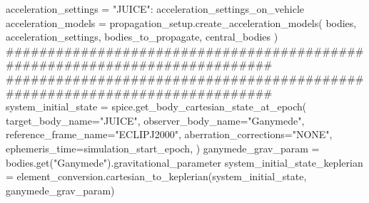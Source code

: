 {}
\markdownRendererSectionEnd \markdownRendererSectionBegin
{}\markdownRendererInterblockSeparator
{}acceleration_settings = {"JUICE": acceleration_settings_on_vehicle}\markdownRendererInterblockSeparator
{}
\markdownRendererSectionEnd \markdownRendererSectionBegin
{}\markdownRendererInterblockSeparator
{}acceleration_models = propagation_setup.create_acceleration_models( bodies, acceleration_settings, bodies_to_propagate, central_bodies )\markdownRendererInterblockSeparator
{}###########################################################################\markdownRendererInterblockSeparator
{}
\markdownRendererSectionEnd \markdownRendererSectionBegin
{}\markdownRendererInterblockSeparator
{}###########################################################################\markdownRendererInterblockSeparator
{}
\markdownRendererSectionEnd \markdownRendererSectionBegin
{}\markdownRendererInterblockSeparator
{}system_initial_state = spice.get_body_cartesian_state_at_epoch( target_body_name="JUICE", observer_body_name="Ganymede", reference_frame_name="ECLIPJ2000", aberration_corrections="NONE", ephemeris_time=simulation_start_epoch, )\markdownRendererInterblockSeparator
{}
\markdownRendererSectionEnd \markdownRendererSectionBegin
{}\markdownRendererInterblockSeparator
{}ganymede_grav_param = bodies.get("Ganymede").gravitational_parameter\markdownRendererInterblockSeparator
{}
\markdownRendererSectionEnd \markdownRendererSectionBegin
{}\markdownRendererInterblockSeparator
{}
\markdownRendererSectionEnd \markdownRendererSectionBegin
{}\markdownRendererInterblockSeparator
{}system_initial_state_keplerian = element_conversion.cartesian_to_keplerian(system_initial_state, ganymede_grav_param)\markdownRendererInterblockSeparator
{}
\markdownRendererSectionEnd \markdownRendererSectionBegin
{}\markdownRendererInterblockSeparator
{}
\markdownRendererSectionEnd \markdownRendererSectionBegin
{}\markdownRendererInterblockSeparator
